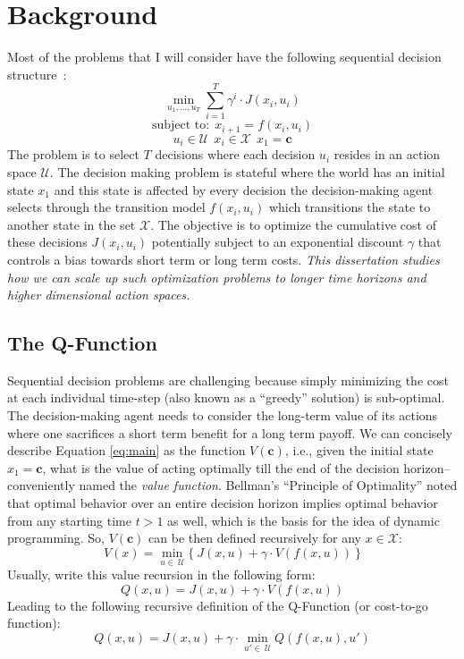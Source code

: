 \setcounter{secnumdepth}{0}
\section{Background}
Most of the problems that I will consider have the following sequential decision structure~\cite{bertsekas1995dynamic}:
\begin{equation}
\min_{u_1,...,u_T} \sum_{i=1}^T \gamma^i \cdot J(x_i, u_i) 
\label{eq:main}
\end{equation}
\[
\text{subject to:} ~~ x_{i+1} = f(x_i, u_i)
\]
\[
u_i \in \mathcal{U} ~~ x_i \in \mathcal{X} ~~ x_1 = \mathbf{c}
\]
The problem is to select $T$ decisions where each decision $u_i$ resides in an action space $\mathcal{U}$. The decision making problem is stateful where the world has an initial state $x_1$ and this state is affected by every decision the decision-making agent selects through the transition model $f(x_i, u_i)$ which transitions the state to another state in the set $\mathcal{X}$. The objective is to optimize the cumulative cost of these decisions $J(x_i,u_i)$ potentially subject to an exponential discount $\gamma$ that controls a bias towards short term or long term costs. \emph{This dissertation studies how we can scale up such optimization problems to longer time horizons and higher dimensional action spaces.}

\subsection*{The Q-Function}
Sequential decision problems are challenging because simply minimizing the cost at each individual time-step (also known as a ``greedy'' solution) is sub-optimal. The decision-making agent needs to consider the long-term value of its actions where one sacrifices a short term benefit for a long term payoff.
We can concisely describe Equation \ref{eq:main} as the function $V(\mathbf{c})$, i.e., given the initial state $x_1 = \mathbf{c}$, what is the value of acting optimally till the end of the decision horizon--conveniently named the \emph{value function}. Bellman's ``Principle of Optimality'' noted that optimal behavior over an entire decision horizon implies optimal behavior from any starting time $t>1$ as well, which is the basis for the idea of dynamic programming.
So, $V(\mathbf{c})$ can be then defined recursively for any $x \in \mathcal{X}$:
\begin{equation}
V(x) = \min_{u \in ~ \mathcal{U} }\{~J(x, u) + \gamma \cdot V( f(x,u) ) ~\}
\label{eq:value}
\end{equation}
Usually, write this value recursion in the following form:
\[
Q(x,u) = J(x, u) + \gamma \cdot V( f(x,u) )
\]
Leading to the following recursive definition of the Q-Function (or cost-to-go function):
\begin{equation}
Q(x,u) = J(x, u) + \gamma \cdot \min_{u' \in ~ \mathcal{U} } Q( f(x,u) ,u')
\label{eq:q}
\end{equation}

